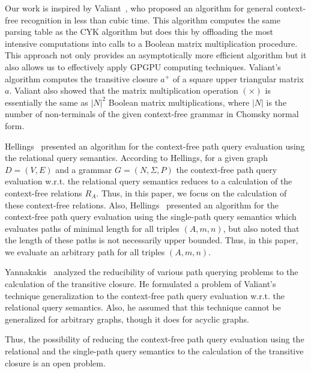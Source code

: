 Our work is inspired by Valiant~\cite{valiant}, who proposed an algorithm for general context-free recognition in less than cubic time. This algorithm computes the same parsing table as the CYK algorithm but does this by offloading the most intensive computations into calls to a Boolean matrix multiplication procedure. This approach not only provides an asymptotically more efficient algorithm but it also allows us to effectively apply GPGPU computing techniques. Valiant's algorithm computes the transitive closure $a^+$ of a square upper triangular matrix $a$. Valiant also showed that the matrix multiplication operation $(\times)$ is essentially the same as $|N|^2$ Boolean matrix multiplications, where $|N|$ is the number of non-terminals of the given context-free grammar in Chomsky normal form.

Hellings~\cite{hellingsRelational} presented an algorithm for the context-free path query evaluation using the relational query semantics. According to Hellings, for a given graph $D = (V, E)$ and a grammar $G = (N, \Sigma, P)$ the context-free path query evaluation w.r.t. the relational query semantics reduces to a calculation of the context-free relations $R_A$. Thus, in this paper, we focus on the calculation of these context-free relations. Also, Hellings~\cite{hellingsRelational} presented an algorithm for the context-free path query evaluation using the single-path query semantics which evaluates paths of minimal length for all triples $(A,m,n)$, but also noted that the length of these paths is not necessarily upper bounded. Thus, in this paper, we evaluate an arbitrary path for all triples $(A,m,n)$.

Yannakakis~\cite{transitive-closure} analyzed the reducibility of various path querying problems to the calculation of the transitive closure. He formulated a problem of Valiant's technique generalization to the context-free path query evaluation w.r.t. the relational query semantics. Also, he assumed that this technique cannot be generalized for arbitrary graphs, though it does for acyclic graphs.

Thus, the possibility of reducing the context-free path query evaluation using the relational and the single-path query semantics to the calculation of the transitive closure is an open problem.
